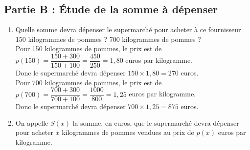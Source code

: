\documentclass[a4paper,11pt,exos]{nsi} %
\begin{document}
\subsection*{Partie B : Étude de la somme à dépenser}
\begin{enumerate}
    \item \textcolor{UGLiBlue}{Quelle somme devra dépenser le supermarché pour acheter à ce fournisseur 150 kilogrammes de pommes ? 700 kilogrammes de pommes ?}\\[.5em]
    Pour 150 kilogrammes de pommes, le prix est de $p(150)=\dfrac{150+300}{150+100}=\dfrac{450}{250}=1,80$ euros par kilogramme.\\
    Donc le supermarché devra dépenser $150\times 1,80=270$ euros.\\[.5em]
    Pour 700 kilogrammes de pommes, le prix est de $p(700)=\dfrac{700+300}{700+100}=\dfrac{1000}{800}=1,25$ euros par kilogramme.\\
    Donc le supermarché devra dépenser $700\times 1,25=875$ euros.
    \item \textcolor{UGLiBlue}{On appelle $S(x)$ la somme, en euros, que le supermarché devra dépenser pour acheter $x$ kilogrammes de pommes vendues au prix de $p(x)$ euros par kilogramme.}
\end{enumerate}
\end{document}

